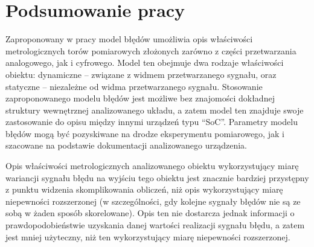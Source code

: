 \chapter{Podsumowanie pracy}

Zaproponowany w pracy model błędów umożliwia opis właściwości metrologicznych torów pomiarowych złożonych zarówno z części przetwarzania analogowego, jak i cyfrowego. Model ten obejmuje dwa rodzaje właściwości obiektu: dynamiczne -- związane z widmem przetwarzanego sygnału, oraz statyczne -- niezależne od widma przetwarzanego sygnału. Stosowanie zaproponowanego modelu błędów jest możliwe bez znajomości dokładnej struktury wewnętrznej analizowanego układu, a zatem model ten znajduje swoje zastosowanie do opisu między innymi urządzeń typu \enquote{SoC}. Parametry modelu błędów mogą być pozyskiwane na drodze eksperymentu pomiarowego, jak i szacowane na podstawie dokumentacji analizowanego urządzenia.

Opis właściwości metrologicznych analizowanego obiektu wykorzystujący miarę wariancji sygnału błędu na wyjściu tego obiektu jest znacznie bardziej przystępny z punktu widzenia skomplikowania obliczeń, niż opis wykorzystujący miarę niepewności rozszerzonej (w szczególności, gdy kolejne sygnały błędów nie są ze sobą w żaden sposób skorelowane). Opis ten nie dostarcza jednak informacji o prawdopodobieństwie uzyskania danej wartości realizacji sygnału błędu, a zatem jest mniej użyteczny, niż ten wykorzystujący miarę niepewności rozszerzonej.

